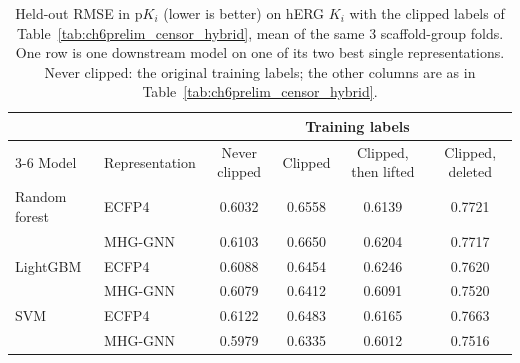 \begin{table}[htbp]
\centering
\small
\begin{tabular}{@{}llcccc@{}}
\toprule
 & & \multicolumn{4}{c}{Training labels} \\
\cmidrule(l){3-6}
Model & Representation & Never clipped & Clipped & Clipped, then lifted & Clipped, deleted \\
\midrule
Random forest & ECFP4 & 0.6032 & 0.6558 & 0.6139 & 0.7721 \\
 & MHG-GNN & 0.6103 & 0.6650 & 0.6204 & 0.7717 \\
\midrule
LightGBM & ECFP4 & 0.6088 & 0.6454 & 0.6246 & 0.7620 \\
 & MHG-GNN & 0.6079 & 0.6412 & 0.6091 & 0.7520 \\
\midrule
SVM & ECFP4 & 0.6122 & 0.6483 & 0.6165 & 0.7663 \\
 & MHG-GNN & 0.5979 & 0.6335 & 0.6012 & 0.7516 \\
\bottomrule
\end{tabular}
\caption[Correcting clipped labels on hERG $K_i$ in single representations]{Held-out RMSE in p$K_i$ (lower is better) on hERG $K_i$ with the clipped labels of Table~\ref{tab:ch6prelim_censor_hybrid}, mean of the same 3 scaffold-group folds. One row is one downstream model on one of its two best single representations. Never clipped: the original training labels; the other columns are as in Table~\ref{tab:ch6prelim_censor_hybrid}.}
\label{tab:ch6prelim_censor_single}
\end{table}


